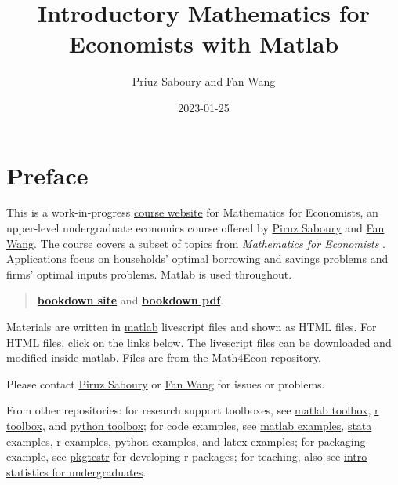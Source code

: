 \documentclass[
]{book}
\title{Introductory Mathematics for Economists with Matlab}
\author{Priuz Saboury and Fan Wang}
\date{2023-01-25}
\begin{document}
\maketitle

{
\hypersetup{linkcolor=}
\setcounter{tocdepth}{1}
\tableofcontents
}
\hypertarget{preface}{%
\chapter*{Preface}\label{preface}}

This is a work-in-progress \href{http://math4econ.github.io/}{course website} for Mathematics for Economists, an upper-level undergraduate economics course offered by \href{https://piruzsaboury.weebly.com/}{Piruz Saboury} and \href{https://fanwangecon.github.io/}{Fan Wang}. The course covers a subset of topics from \emph{Mathematics for Economists} \citep{simonblume1994}. Applications focus on households' optimal borrowing and savings problems and firms' optimal inputs problems. Matlab is used throughout.

\begin{quote}
\href{https://Math4Econ.github.io/bookdown}{\textbf{bookdown site}} and \href{https://Math4econ.github.io/bookdown/Introductory-Mathematics-for-Economists-with-Matlab.pdf}{\textbf{bookdown pdf}}.
\end{quote}

Materials are written in \href{https://www.mathworks.com/products/matlab.html}{matlab} \citep{matlab} livescript files and shown as HTML files. For HTML files, click on the links below. The livescript files can be downloaded and modified inside matlab. Files are from the \href{https://github.com/Math4Econ/Math4Econ.github.io}{Math4Econ} repository.

Please contact \href{https://piruzsaboury.weebly.com/}{Piruz Saboury} or \href{https://fanwangecon.github.io/}{Fan Wang} for issues or problems.

From other repositories: for research support toolboxes, see \href{https://fanwangecon.github.io/mecontools/}{matlab toolbox}, \href{https://fanwangecon.github.io/recontools/}{r toolbox}, and \href{https://pyfan.readthedocs.io/en/latest/}{python toolbox}; for code examples, see \href{https://fanwangecon.github.io/m4econ/}{matlab examples}, \href{https://fanwangecon.github.io/stata4econ/}{stata examples}, \href{https://fanwangecon.github.io/r4econ/}{r examples}, \href{https://fanwangecon.github.io/py4econ/}{python examples}, and \href{https://fanwangecon.github.io/tex4econ/}{latex examples}; for packaging example, see \href{http://fanwangecon.github.io/pkgtestr}{pkgtestr} for developing r packages; for teaching, also see \href{https://fanwangecon.github.io/stat4econ/}{intro statistics for undergraduates}.
\end{document}
